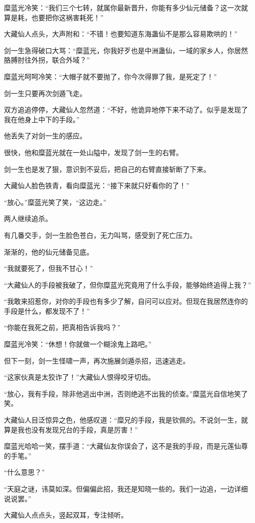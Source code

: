 \begin{this_body}
糜蓝光冷笑：“我们三个七转，就属你最新晋升，你能有多少仙元储备？这一次就算是耗，也要把你这祸害耗死！”

大藏仙人点头，大声附和：“不错！也要知道东海蛊仙不是那么容易欺哄的！”

剑一生急得破口大骂：“糜蓝光，你我好歹也是中洲蛊仙，一域的家乡人，你居然胳膊肘往外拐，联合外域？”

糜蓝光呵呵冷笑：“大帽子就不要抛了，你今次得罪了我，是死定了！”

剑一生只要再次剑遁飞走。

双方追追停停，大藏仙人忽然道：“不好，他诡异地停下来不动了。似乎是发现了我在他身上中下的手段。”

他丢失了对剑一生的感应。

很快，他和糜蓝光就在一处山隘中，发现了剑一生的右臂。

剑一生也是发了狠，意识到不妥后，把自己的右臂直接斩断了下来。

大藏仙人脸色铁青，看向糜蓝光：“接下来就只好看你的了！”

“放心。”糜蓝光笑了笑，“这边走。”

两人继续追杀。

有几番交手，剑一生脸色苍白，无力叫骂，感受到了死亡压力。

渐渐的，他的仙元储备见底。

“我就要死了，但我不甘心！”

“大藏仙人的手段被我破了，但你糜蓝光究竟用了什么手段，能够始终追得上我？”

“我敢来招惹你，对你的手段也有多少了解，自问可以应对。但现在我居然连你的手段是什么，都发现不了！”

“你能在我死之前，把真相告诉我吗？”

糜蓝光冷笑：“休想！你就做一个糊涂鬼上路吧。”

但下一刻，剑一生怪啸一声，再次施展剑遁杀招，迅速逃走。

“这家伙真是太狡诈了！”大藏仙人恨得咬牙切齿。

“放心，我有手段，除非他逃出中洲，否则绝逃不出我的侦查。”糜蓝光自信地笑了笑。

大藏仙人目泛惊异之色，他感叹道：“糜兄的手段，我是钦佩的。不说剑一生，就算是我也没有发现兄台的手段，真是厉害！”

糜蓝光哈哈一笑，摆手道：“大藏仙友你误会了，这不是我的手段，而是元莲仙尊的手笔。”

“什么意思？”

“天庭之谜，讳莫如深。但偏偏此招，我还是知晓一些的。我们一边追，一边详细说说罢。”

大藏仙人点点头，竖起双耳，专注倾听。


\end{this_body}
